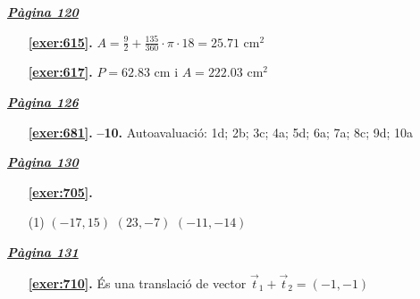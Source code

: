 \hyperlink{page.120}{\textbf{\em Pàgina 120}}
\begin{enumerate}
\item[\fontfamily{phv}\selectfont\color{blue}\textbf{\ref{exer:615}. }] \label{ans:615} 
$A=\frac {9}{2}+ \frac {135}{360} \cdot \pi \cdot 18 = 25.71$ cm$^2$
 \end{enumerate}
\begin{enumerate}
\item[\fontfamily{phv}\selectfont\color{blue}\textbf{\ref{exer:617}. }] \label{ans:617} 
$P=62.83$ cm i $A=222.03$ cm$^2$
 \end{enumerate}
\vspace{0.3cm}


\hyperlink{page.126}{\textbf{\em Pàgina 126}}
\begin{enumerate}
\item[\fontfamily{phv}\selectfont\color{blue}\textbf{\ref{exer:681}. }] \label{ans:681} 
\textbf {--10.} Autoavaluació: 1d; 2b; 3c; 4a; 5d; 6a; 7a; 8c; 9d; 10a
 \end{enumerate}

 \vspace{1cm} 
 

\vspace{0.3cm}


\hyperlink{page.130}{\textbf{\em Pàgina 130}}
\begin{enumerate}



 \item[\fontfamily{phv}\selectfont\color{blue}\textbf{\ref{exer:705}. }] \label{ans:705}
 \begin{tasks}[column-sep=1em, item-indent=1.3333em](1)
	 \task $(-17,15)$
	 \task $(23,-7)$
	 \task $(-11,-14)$
\end{tasks}
 \end{enumerate}
\vspace{0.3cm}


\hyperlink{page.131}{\textbf{\em Pàgina 131}}
\begin{enumerate}
\item[\fontfamily{phv}\selectfont\color{blue}\textbf{\ref{exer:710}. }] \label{ans:710} 
És una translació de vector $\vec t_1 + \vec t_2 = (-1,-1)$
 \end{enumerate}
\vspace{0.3cm}

